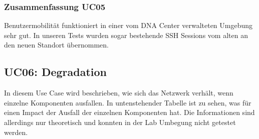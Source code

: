 \begin{landscape}
\subsubsection{Zusammenfassung UC05}
Benutzermobilität funktioniert in einer vom DNA Center verwalteten Umgebung sehr gut. In unseren Tests wurden sogar bestehende SSH Sessions vom alten an den neuen Standort übernommen. 
\pagebreak
\subsection{UC06: Degradation}
In diesem Use Case wird beschrieben, wie sich das Netzwerk verhält, wenn einzelne Komponenten ausfallen. In untenstehender Tabelle ist zu sehen, was für einen Impact der Ausfall der einzelnen Komponenten hat. Die Informationen sind allerdings nur theoretisch und konnten in der Lab Umbegung nicht getestet werden.
\\


\end{landscape}

